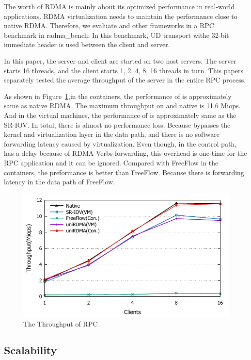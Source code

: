 The worth of RDMA is mainly about its optimized performance in real-world applications. RDMA virtualization needs to maintain the performance close to native RDMA. Therefore, we evaluate \sys and other frameworks in a RPC benchmark in radma\_bench\cite{rbench}. In this benchmark, UD transport withe 32-bit immediate header is used between the client and server.

In this paper, the server and client are started on two host servers. The server starts 16 threads, and the client starts 1, 2, 4, 8, 16 threads in turn. This papers separately tested the average throughput of the server in the entire RPC process.

As shown in Figure~\ref{fig:rpc},in the containers, the performance of \sys is approximately same as native RDMA. The
maximum throughput on \sys and native is 11.6 Miops. And in the virtual machines, the performance of \sys is approximately same as the SR-IOV. In total, there is almost no performance loss. Because \sys bypasses the kernel and virtualization layer in the data path, and there is no software forwarding latency caused by virtualization. Even though, in the control path, \sys has a delay because of RDMA Verbs forwarding, this overhead is one-time for the RPC application and it can be ignored. Compared with FreeFlow in the containers, the preformance \sys is better than FreeFlow. Because there is forwarding latency in the data path of FreeFlow.

\begin{figure}[!ht]
	\centering
	\includegraphics[width=1.0\linewidth]{images/rpc.pdf}
	\caption{The Throughput of RPC}
	\label{fig:rpc}
\end{figure}

\subsection{Scalability}
